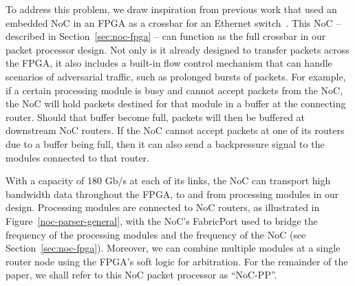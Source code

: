 %
%

To address this problem, we draw inspiration from previous work that used an embedded NoC in an FPGA as a crossbar for an Ethernet switch~\cite{bitar2014efficient,abdelfattah2015take}.
This NoC -- described in Section~\ref{sec:noc-fpga} -- can function as the full crossbar in our packet processor design.
Not only is it already designed to transfer packets across the FPGA, it also includes a built-in flow control mechanism that can handle scenarios of adversarial traffic, such as prolonged bursts of packets.
For example, if a certain processing module is busy and cannot accept packets from the NoC, the NoC will hold packets destined for that module in a buffer at the connecting router.
Should that buffer become full, packets will then be buffered at downstream NoC routers.
If the NoC cannot accept packets at one of its routers due to a buffer being full, then it can also send a backpressure signal to the modules connected to that router.

With a capacity of 180 Gb/s at each of its links, the NoC can transport high bandwidth data throughout the FPGA, to and from processing modules in our design.
Processing modules are connected to NoC routers, as illustrated in Figure~\ref{noc-parser-general}, with the NoC's FabricPort used to bridge the frequency of the processing modules and the frequency of the NoC (see Section~\ref{sec:noc-fpga}).
Moreover, we can combine multiple modules at a single router node using the FPGA's soft logic for arbitration.
For the remainder of the paper, we shall refer to this NoC packet processor as ``NoC-PP''.


%
%

%
%
